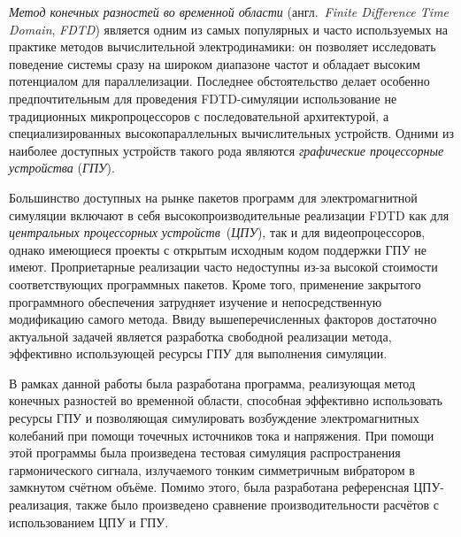 
\textit{Метод конечных разностей во временной области} (англ.~\textit{Finite Difference Time Domain}, \textit{FDTD}) является одним из самых популярных и часто используемых на практике методов вычислительной электродинамики: он позволяет исследовать поведение системы сразу на широком диапазоне частот и обладает высоким потенциалом для параллелизации. Последнее обстоятельство делает особенно предпочтительным для проведения FDTD-симуляции использование не традиционных микропроцессоров с последовательной архитектурой, а специализированных высокопараллельных вычислительных устройств. Одними из наиболее доступных устройств такого рода 
являются \textit{графические процессорные устройства} (\textit{ГПУ}).

Большинство доступных на рынке пакетов программ для электромагнитной симуляции включают в себя высокопроизводительные реализации FDTD как для \textit{центральных процессорных устройств}~(\textit{ЦПУ}), так и для видеопроцессоров, однако имеющиеся проекты с открытым исходным кодом поддержки ГПУ не имеют. Проприетарные реализации часто недоступны из-за высокой стоимости соответствующих программных пакетов. Кроме того, применение закрытого программного обеспечения затрудняет изучение и непосредственную модификацию самого метода. Ввиду вышеперечисленных факторов достаточно актуальной задачей является разработка свободной реализации метода, эффективно использующей ресурсы ГПУ для выполнения симуляции.

В рамках данной работы была разработана программа, реализующая метод конечных разностей во временной области, способная эффективно использовать ресурсы ГПУ и позволяющая симулировать возбуждение электромагнитных колебаний при помощи точечных источников тока и напряжения. При помощи этой программы была произведена тестовая симуляция распространения гармонического сигнала, излучаемого тонким симметричным вибратором в замкнутом счётном объёме. Помимо этого, была 
разработана референсная ЦПУ-реализация, также было произведено сравнение производительности расчётов с использованием ЦПУ и ГПУ.

\clearpage